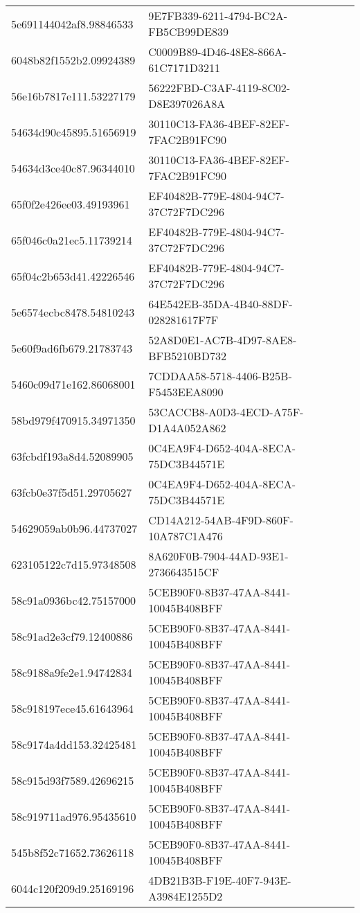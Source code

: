 \begin{tabular}{ll}
5e691144042af8.98846533 & 9E7FB339-6211-4794-BC2A-FB5CB99DE839 \\
6048b82f1552b2.09924389 & C0009B89-4D46-48E8-866A-61C7171D3211 \\
56e16b7817e111.53227179 & 56222FBD-C3AF-4119-8C02-D8E397026A8A \\
54634d90c45895.51656919 & 30110C13-FA36-4BEF-82EF-7FAC2B91FC90 \\
54634d3ce40c87.96344010 & 30110C13-FA36-4BEF-82EF-7FAC2B91FC90 \\
65f0f2e426ee03.49193961 & EF40482B-779E-4804-94C7-37C72F7DC296 \\
65f046c0a21ec5.11739214 & EF40482B-779E-4804-94C7-37C72F7DC296 \\
65f04c2b653d41.42226546 & EF40482B-779E-4804-94C7-37C72F7DC296 \\
5e6574ecbc8478.54810243 & 64E542EB-35DA-4B40-88DF-028281617F7F \\
5e60f9ad6fb679.21783743 & 52A8D0E1-AC7B-4D97-8AE8-BFB5210BD732 \\
5460c09d71e162.86068001 & 7CDDAA58-5718-4406-B25B-F5453EEA8090 \\
58bd979f470915.34971350 & 53CACCB8-A0D3-4ECD-A75F-D1A4A052A862 \\
63fcbdf193a8d4.52089905 & 0C4EA9F4-D652-404A-8ECA-75DC3B44571E \\
63fcb0e37f5d51.29705627 & 0C4EA9F4-D652-404A-8ECA-75DC3B44571E \\
54629059ab0b96.44737027 & CD14A212-54AB-4F9D-860F-10A787C1A476 \\
623105122c7d15.97348508 & 8A620F0B-7904-44AD-93E1-2736643515CF \\
58c91a0936bc42.75157000 & 5CEB90F0-8B37-47AA-8441-10045B408BFF \\
58c91ad2e3cf79.12400886 & 5CEB90F0-8B37-47AA-8441-10045B408BFF \\
58c9188a9fe2e1.94742834 & 5CEB90F0-8B37-47AA-8441-10045B408BFF \\
58c918197ece45.61643964 & 5CEB90F0-8B37-47AA-8441-10045B408BFF \\
58c9174a4dd153.32425481 & 5CEB90F0-8B37-47AA-8441-10045B408BFF \\
58c915d93f7589.42696215 & 5CEB90F0-8B37-47AA-8441-10045B408BFF \\
58c919711ad976.95435610 & 5CEB90F0-8B37-47AA-8441-10045B408BFF \\
545b8f52c71652.73626118 & 5CEB90F0-8B37-47AA-8441-10045B408BFF \\
6044c120f209d9.25169196 & 4DB21B3B-F19E-40F7-943E-A3984E1255D2 \\

\end{tabular}
